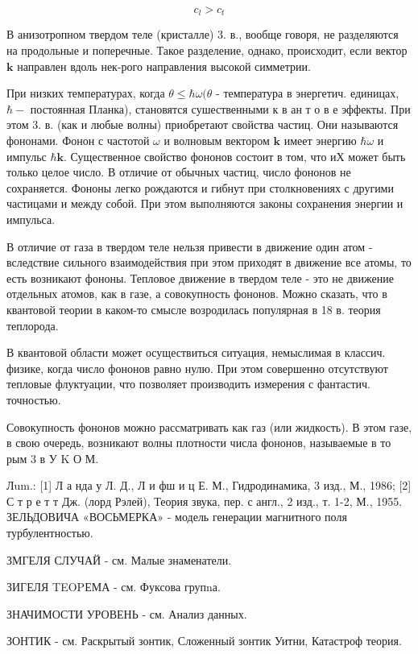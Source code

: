 \documentclass[10pt]{article}
\begin{document}
\[

c_{l}>c_{t}

\]



В анизотропном твердом теле (кристалле) 3. в., вообще говоря, не разделяются на продольные и поперечные. Такое разделение, однако, происходит, если вектор $\boldsymbol{k}$ направлен вдоль нек-рого направления высокой симметрии.



При низких температурах, когда $\theta \leqslant \hbar \omega(\theta$ - температура в энергетич. единицах, $\hbar-$ постоянная Планка), становятся сушественными к в ан т о в е эффекты. При этом 3. в. (как и любые волны) приобретают свойства частиц. Они называются фононами. Фонон с частотой $\omega$ и волновым вектором $\boldsymbol{k}$ имеет энергию $\hbar \omega$ и импульс $\hbar \boldsymbol{k}$. Существенное свойство фононов состоит в том, что иХ может быть только целое число. В отличие от обычных частиц, число фононов не сохраняется. Фононы легко рождаются и гибнут при столкновениях с другими частицами и между собой. При этом выполняются законы сохранения энергии и импульса.



В отличие от газа в твердом теле нельзя привести в движение один атом - вследствие сильного взаимодействия при этом приходят в движение все атомы, то есть возникают фононы. Тепловое движение в твердом теле - это не движение отдельных атомов, как в газе, а совокупность фононов. Можно сказать, что в квантовой теории в каком-то смысле возродилась популярная в 18 в. теория теплорода.



В квантовой области может осуществиться ситуация, немыслимая в классич. физике, когда число фононов равно нулю. При этом совершенно отсутствуют тепловые флуктуации, что позволяет производить измерения с фантастич. точностью.



Совокупность фононов можно рассматривать как газ (или жидкость). В этом газе, в свою очередь, возникают волны плотности числа фононов, называемые в то рым 3 в У K О М.



Лum.: [1] Л а нда у Л. Д., Л и фш и ц Е. М., Гидродинамика, 3 изд., М., 1986; [2] С т р е т т Дж. (лорд Рэлей), Теория звука, пер. с англ., 2 изд., т. 1-2, М., 1955. ЗЕЛЬДОВИЧА «ВОСЬМЕРКА» - модель генерации магнитного поля турбулентностью.



ЗМГЕЛЯ СЛУЧАЙ - см. Малые знаменатели.



ЗИГЕЛЯ TEOPЕМА - см. Фуксова групnа.



ЗНАЧИМОСТИ УРОВЕНЬ - см. Анализ данных.



ЗОНТИК - см. Раскрытый зонтик, Сложенный зонтик Уитни, Катастроф теория.
\end{document}
